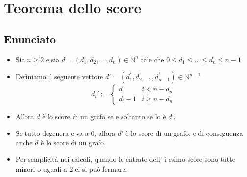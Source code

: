 \documentclass[10pt]{article}
\begin{document}
	\newpage
	\section{Teorema dello score}
	\subsection{Enunciato}
	\begin{itemize}
	\item
	Sia $n \geq 2$ e sia $d = (d_1, d_2, \dotso\,,d_n) \in \mathbb{N}^n$ tale che $0 \leq d_1 \leq \dotso \leq d_n \leq n-1$
	\item
	Definiamo il seguente vettore $d' = (d^{'}_1, d^{'}_2, \dotso\,,d^{'}_{n-1}) \in \mathbb{N}^{n-1}$
	\begin{equation}
	d_{i}' := 
	\begin{cases}
	d_i & i < n-d_n \\
	d_i - 1 & i \geq n-d_n
	\end{cases}
	\end{equation}
	\item
	Allora $d$ è lo score di un grafo se e soltanto se lo è $d'$.
	\item
	Se tutto degenera e va a 0, allora $d'$ è lo score di un grafo, e di conseguenza anche $d$ è lo score di un grafo.
	\item
	Per semplicità nei calcoli, quando le entrate dell' i-esimo score sono tutte minori o uguali a $2$ ci si può fermare.
	\end{itemize}
	
\end{document}
